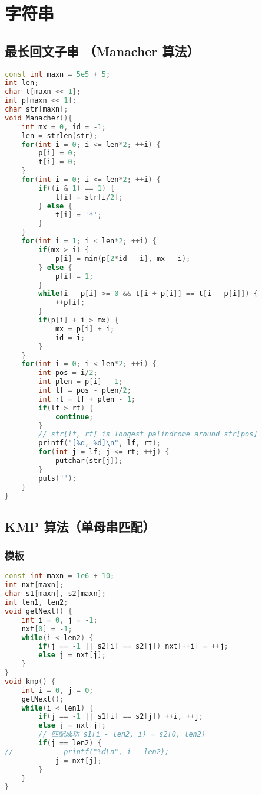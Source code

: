 

\section{字符串}

\subsection{最长回文子串 （Manacher 算法）}

\begin{lstlisting}[language=C++]
const int maxn = 5e5 + 5;
int len;
char t[maxn << 1];
int p[maxn << 1];
char str[maxn];
void Manacher(){
    int mx = 0, id = -1;
    len = strlen(str);
    for(int i = 0; i <= len*2; ++i) {
        p[i] = 0;
        t[i] = 0;
    }
    for(int i = 0; i <= len*2; ++i) {
        if((i & 1) == 1) {
            t[i] = str[i/2];
        } else {
            t[i] = '*';
        }
    }
    for(int i = 1; i < len*2; ++i) {
        if(mx > i) {
            p[i] = min(p[2*id - i], mx - i);
        } else {
            p[i] = 1;
        }
        while(i - p[i] >= 0 && t[i + p[i]] == t[i - p[i]]) {
            ++p[i];
        }
        if(p[i] + i > mx) {
            mx = p[i] + i;
            id = i;
        }
    }
    for(int i = 0; i < len*2; ++i) {
        int pos = i/2;
        int plen = p[i] - 1;
        int lf = pos - plen/2;
        int rt = lf + plen - 1;
        if(lf > rt) {
            continue;
        }
        // str[lf, rt] is longest palindrome around str[pos]
        printf("[%d, %d]\n", lf, rt);
        for(int j = lf; j <= rt; ++j) {
            putchar(str[j]);
        }
        puts("");
    }
}
\end{lstlisting}

\subsection{KMP 算法（单母串匹配）}

\subsubsection{模板}

\begin{lstlisting}[language=C++]
const int maxn = 1e6 + 10;
int nxt[maxn];
char s1[maxn], s2[maxn];
int len1, len2;
void getNext() {
    int i = 0, j = -1;
    nxt[0] = -1;
    while(i < len2) {
        if(j == -1 || s2[i] == s2[j]) nxt[++i] = ++j;
        else j = nxt[j];
    }
}
void kmp() {
    int i = 0, j = 0;
    getNext();
    while(i < len1) {
        if(j == -1 || s1[i] == s2[j]) ++i, ++j;
        else j = nxt[j];
        // 匹配成功 s1[i - len2, i) = s2[0, len2)
        if(j == len2) { 
//            printf("%d\n", i - len2);
            j = nxt[j];
        }
    }
}
\end{lstlisting}

